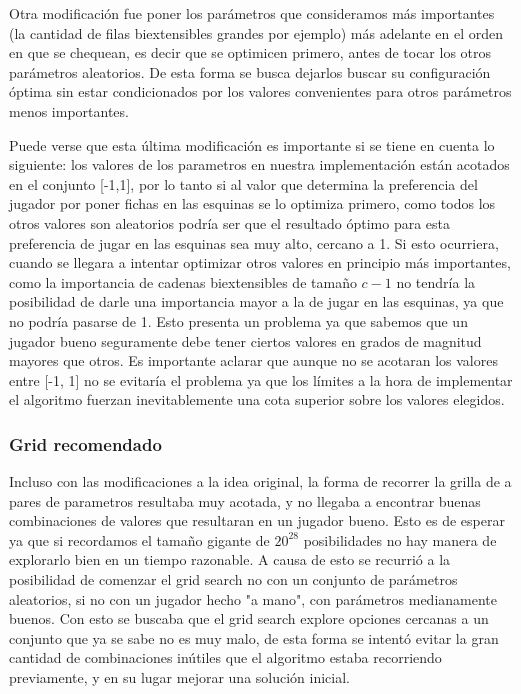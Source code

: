 \documentclass[A4paper,oneside,fleqn,11pt]{article}
\theoremstyle{definition}
\begin{document}
Otra modificación fue poner los parámetros que consideramos más importantes (la cantidad de filas biextensibles grandes por ejemplo) más adelante en el orden en que se chequean, es decir que se optimicen primero, antes de tocar los otros parámetros aleatorios. De esta forma se busca dejarlos buscar su configuración óptima sin estar condicionados por los valores convenientes para otros parámetros menos importantes. 

Puede verse que esta última modificación es importante si se tiene en cuenta lo siguiente: los valores de los parametros en nuestra implementación están acotados en el conjunto [-1,1], por lo tanto si al valor que determina la preferencia del jugador por poner fichas en las esquinas se lo optimiza primero, como todos los otros valores son aleatorios podría ser que el resultado óptimo para esta preferencia de jugar en las esquinas sea muy alto, cercano a 1. Si esto ocurriera, cuando se llegara a intentar optimizar otros valores en principio más importantes, como la importancia de cadenas biextensibles de tamaño $c-1$ no tendría la posibilidad de darle una importancia mayor a la de jugar en las esquinas, ya que no podría pasarse de 1. Esto presenta un problema ya que sabemos que un jugador bueno seguramente debe tener ciertos valores en grados de magnitud mayores que otros. Es importante aclarar que aunque no se acotaran los valores entre [-1, 1] no se evitaría el problema ya que los límites a la hora de implementar el algoritmo fuerzan inevitablemente una cota superior sobre los valores elegidos.



\subsubsection{Grid recomendado}

Incluso con las modificaciones a la idea original, la forma de recorrer la grilla de a pares de parametros resultaba muy acotada, y no llegaba a encontrar buenas combinaciones de valores que resultaran en un jugador bueno. Esto es de esperar ya que si recordamos el tamaño gigante de $ 20^{28}$ posibilidades no hay manera de explorarlo bien en un tiempo razonable. A causa de esto se recurrió a la posibilidad de comenzar el grid search no con un conjunto de parámetros aleatorios, si no con un jugador hecho "a mano", con parámetros medianamente buenos. Con esto se buscaba que el grid search explore opciones cercanas a un conjunto que ya se sabe no es muy malo, de esta forma se intentó evitar la gran cantidad de combinaciones inútiles que el algoritmo estaba recorriendo previamente, y en su lugar mejorar una solución inicial.
\end{document}

